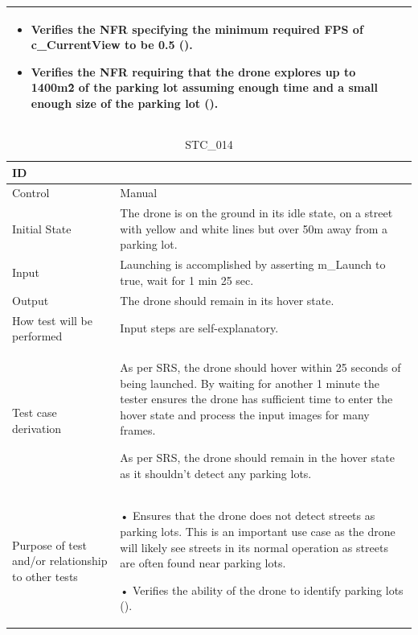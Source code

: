 \documentclass[12pt, titlepage]{article}
\begin{document}
\begin{table}[!h]
\begin{center}
\begin{tabular}{ | m{3.2cm} | m{12.2cm} | }
\begin{itemize}
    \item Verifies the NFR specifying the minimum required FPS of c\_CurrentView to be 0.5 (\nameref{PERF_004}).
    \item Verifies the NFR requiring that the drone explores up to 1400m\^2 of the parking lot assuming enough time and a small enough size of the parking lot (\nameref{PERF_001}).
\end{itemize}
\\ 
\hline
\end{tabular}
\end{center}
\end{table}

\begin{table}[!h]
\begin{center}
\caption {STC\_014}
\label{tab:STC_014}
\begin{tabular}{ | m{3.2cm} | m{12.2cm} | } 
\hline
ID & \nameref{tab:STC_014} \\ 
\hline
Control & Manual \\ 
\hline
Initial State & The drone is on the ground in its idle state, on a street with yellow and white lines but over 50m away from a parking lot. \\ 
\hline
Input & Launching is accomplished by asserting m_Launch to true, wait for 1 min 25 sec. \\ 
\hline
Output & The drone should remain in its hover state. \\ 
\hline
How test will be performed & Input steps are self-explanatory. \\ 
\hline
Test case derivation & As per SRS, the drone should hover within 25 seconds of being launched. By waiting for another 1 minute the tester ensures the drone has sufficient time to enter the hover state and process the input images for many frames. 

As per SRS, the drone should remain in the hover state as it shouldn't detect any parking lots.
 \\ 
\hline
Purpose of test and/or relationship to other tests & 
• Ensures that the drone does not detect streets as parking lots. This is an important use case as the drone will likely see streets in its normal operation as streets are often found near parking lots.

• Verifies the ability of the drone to identify parking lots (\nameref{GEN_001}).
\\ 
\hline
\end{tabular}
\end{center}
\end{table}
\end{document}
